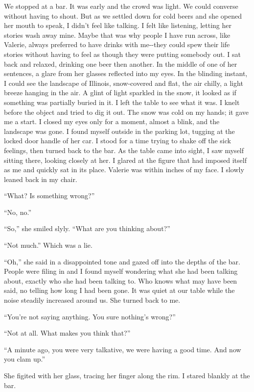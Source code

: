 We stopped at a bar. It was early and the crowd was light. We could
converse without having to shout. But as we settled down for cold beers
and she opened her mouth to speak, I didn't feel like talking. I felt
like listening, letting her stories wash away mine. Maybe that was why
people I have run across, like Valerie, always preferred to have drinks
with me-\/-they could spew their life stories without having to feel as
though they were putting somebody out. I sat back and relaxed, drinking
one beer then another. In the middle of one of her sentences, a glare
from her glasses reflected into my eyes. In the blinding instant, I
could see the landscape of Illinois, snow-covered and flat, the air
chilly, a light breeze hanging in the air. A glint of light sparkled in
the snow, it looked as if something was partially buried in it. I left
the table to see what it was. I knelt before the object and tried to dig
it out. The snow was cold on my hands; it gave me a start. I closed my
eyes only for a moment, almost a blink, and the landscape was gone. I
found myself outside in the parking lot, tugging at the locked door
handle of her car. I stood for a time trying to shake off the sick
feelings, then turned back to the bar. As the table came into sight, I
saw myself sitting there, looking closely at her. I glared at the figure
that had imposed itself as me and quickly sat in its place. Valerie was
within inches of my face. I slowly leaned back in my chair.

``What? Is something wrong?''

``No, no.''

``So,'' she smiled slyly. ``What are you thinking about?''

``Not much.'' Which was a lie.

``Oh,'' she said in a disappointed tone and gazed off into the depths of
the bar. People were filing in and I found myself wondering what she had
been talking about, exactly who she had been talking to. Who knows what
may have been said, no telling how long I had been gone. It was quiet at
our table while the noise steadily increased around us. She turned back
to me.

``You're not saying anything. You sure nothing's wrong?''

``Not at all. What makes you think that?''

``A minute ago, you were very talkative, we were having a good time. And
now you clam up.''

She figited with her glass, tracing her finger along the rim. I stared
blankly at the bar.

